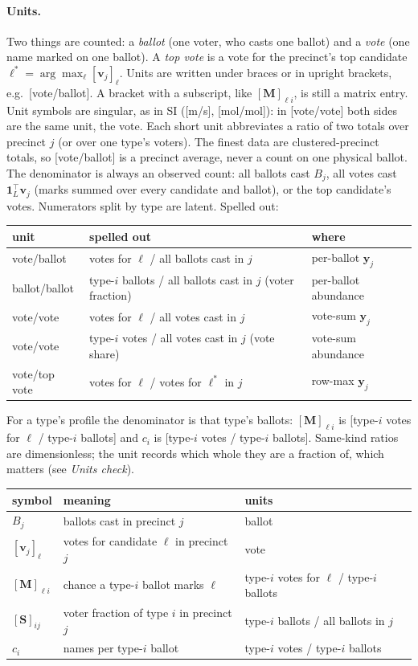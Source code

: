 \documentclass[11pt]{article}
\theoremstyle{remark}
\newcommand{\1}{\mathbf{1}}
\newcommand{\y}{\mathbf{y}}
\newcommand{\vv}{\mathbf{v}}
\newcommand{\M}{\mathbf{M}}
\newcommand{\Sm}{\mathbf{S}}
\begin{document}
\paragraph{Units.} Two things are counted: a \emph{ballot} (one voter, who casts
one ballot) and a \emph{vote} (one name marked on one ballot). A \emph{top vote}
is a vote for the precinct's top candidate $\ell^\ast=\arg\max_\ell[\vv_j]_\ell$.
Units are written under braces or in upright brackets, e.g.\ [vote/ballot]. A
bracket with a subscript, like $[\M]_{\ell i}$, is still a matrix entry.
Unit symbols are singular, as in SI ([m/s], [mol/mol]): in [vote/vote] both
sides are the same unit, the vote. Each short unit abbreviates a ratio of two totals over
precinct $j$ (or over one type's voters). The finest data are clustered-precinct
totals, so [vote/ballot] is a precinct average, never a count on one physical
ballot. The denominator is always an observed count: all ballots cast $B_j$, all
votes cast $\1_L^\top\vv_j$ (marks summed over every candidate and ballot), or
the top candidate's votes. Numerators split by type are latent. Spelled out:
\begin{center}
\small
\begin{tabular}{lll}
\toprule
unit & spelled out & where \\
\midrule
vote/ballot & votes for $\ell$ / all ballots cast in $j$ & per-ballot $\y_j$ \\
ballot/ballot & type-$i$ ballots / all ballots cast in $j$ (voter fraction) & per-ballot abundance \\
vote/vote & votes for $\ell$ / all votes cast in $j$ & vote-sum $\y_j$ \\
vote/vote & type-$i$ votes / all votes cast in $j$ (vote share) & vote-sum abundance \\
vote/top vote & votes for $\ell$ / votes for $\ell^\ast$ in $j$ & row-max $\y_j$ \\
\bottomrule
\end{tabular}
\end{center}
For a type's profile the denominator is that type's ballots: $[\M]_{\ell i}$ is
[type-$i$ votes for $\ell$ / type-$i$ ballots] and $c_i$ is [type-$i$ votes /
type-$i$ ballots]. Same-kind ratios are dimensionless; the unit records which
whole they are a fraction of, which matters (see \emph{Units check}).
\begin{center}
\small
\begin{tabular}{lll}
\toprule
symbol & meaning & units \\
\midrule
$B_j$ & ballots cast in precinct $j$ & ballot \\
$[\vv_j]_\ell$ & votes for candidate $\ell$ in precinct $j$ & vote \\
$[\M]_{\ell i}$ & chance a type-$i$ ballot marks $\ell$ & type-$i$ votes for $\ell$ / type-$i$ ballots \\
$[\Sm]_{ij}$ & voter fraction of type $i$ in precinct $j$ & type-$i$ ballots / all ballots in $j$ \\
$c_i$ & names per type-$i$ ballot & type-$i$ votes / type-$i$ ballots \\
\bottomrule
\end{tabular}
\end{center}
\end{document}
